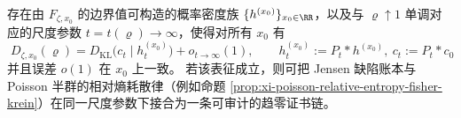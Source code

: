 \begin{conjecture}\label{conj:xi-jensen-defect-reverse-kl-bridge}
存在由 \(F_{\zeta,x_0}\) 的边界值可构造的概率密度族 \(\{h^{(x_0)}\}_{x_0\in\RR}\)，以及与 \(\varrho\uparrow 1\) 单调对应的尺度参数 \(t=t(\varrho)\to\infty\)，使得对所有 \(x_0\) 有
\begin{equation}\label{eq:xi-jensen-defect-reverse-kl-bridge}
\boxed{\;
D_{\zeta,x_0}(\varrho)
=D_{\mathrm{KL}}\!\bigl(c_t\mid h_t^{(x_0)}\bigr)+o_{t\to\infty}(1),\qquad
h_t^{(x_0)}:=P_t*h^{(x_0)},\ c_t:=P_t*c_0\;}
\end{equation}
并且误差 \(o(1)\) 在 \(x_0\) 上一致。
若该表征成立，则可把 Jensen 缺陷账本与 Poisson 半群的相对熵耗散律（例如命题 \ref{prop:xi-poisson-relative-entropy-fisher-krein}）在同一尺度参数下接合为一条可审计的趋零证书链。
\end{conjecture}

\endinput

